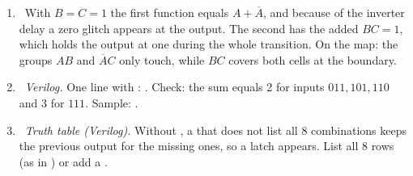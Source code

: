 \begin{enumerate}
  \item {}~With $B=C=1$ the first function equals $A+\overline{A}$, and because of the inverter delay a zero glitch appears at the output. The second has the added $BC=1$, which holds the output at one during the whole transition. On the map: the groups $AB$ and $\overline{A}C$ only touch, while $BC$ covers both cells at the boundary.
  \item {}~\emph{Verilog.} One line with : . Check: the sum equals 2 for inputs $011,101,110$ and 3 for $111$. Sample: .
  \item {}~\emph{Truth table (Verilog).} Without , a  that does not list all 8 combinations keeps the previous output for the missing ones, so a latch appears. List all 8 rows (as in ) or add a .
\end{enumerate}


